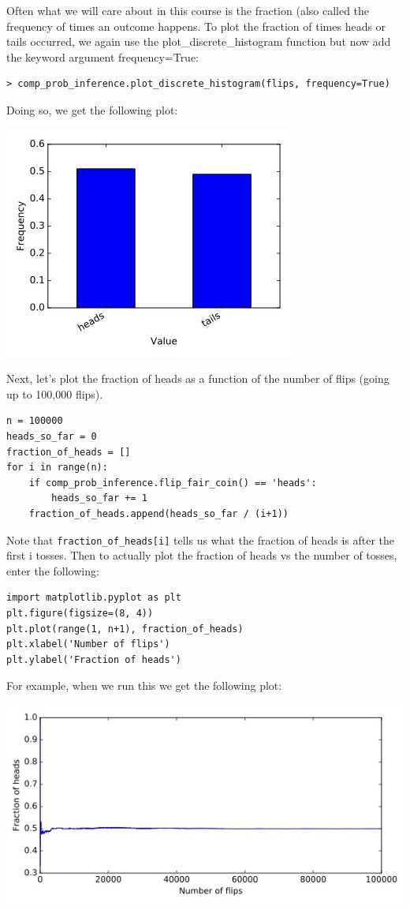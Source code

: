 \documentclass[6008notes.tex]{subfiles}
\begin{document}
Often what we will care about in this course is the fraction (also called the frequency of times an outcome happens. To plot the fraction of times heads or tails occurred, we again use the plot\_discrete\_histogram function but now add the keyword argument frequency=True:

\begin{lstlisting}
> comp_prob_inference.plot_discrete_histogram(flips, frequency=True)
\end{lstlisting}

Doing so, we get the following plot:

{\centering\includegraphics[scale=0.4]{images_sec-intro-histogram-frequencies}}


Next, let's plot the fraction of heads as a function of the number of flips (going up to 100,000 flips).

\begin{lstlisting}
n = 100000
heads_so_far = 0
fraction_of_heads = []
for i in range(n):
    if comp_prob_inference.flip_fair_coin() == 'heads':
        heads_so_far += 1
    fraction_of_heads.append(heads_so_far / (i+1))
\end{lstlisting}
Note that \texttt{fraction\_of\_heads[i]} tells us what the fraction of heads is after the first i tosses. Then to actually plot the fraction of heads vs the number of tosses, enter the following:

\begin{lstlisting}
import matplotlib.pyplot as plt
plt.figure(figsize=(8, 4))
plt.plot(range(1, n+1), fraction_of_heads)
plt.xlabel('Number of flips')
plt.ylabel('Fraction of heads')
\end{lstlisting}

For example, when we run this we get the following plot:

{\centering\includegraphics[scale=0.4]{images_sec-intro-frequency-of-heads-vs-number-of-flips}}
\end{document}
